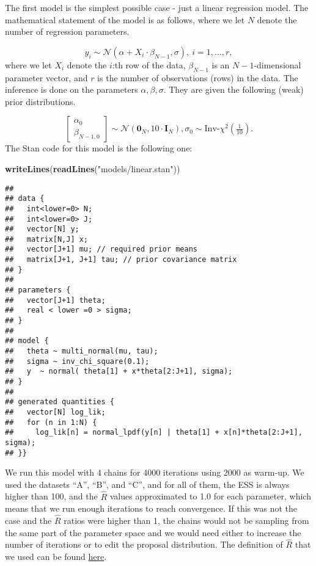 \documentclass[
]{article}
\newenvironment{Shaded}{\begin{snugshade}}{\end{snugshade}}
\newcommand{\KeywordTok}[1]{\textcolor[rgb]{0.13,0.29,0.53}{\textbf{#1}}}
\newcommand{\NormalTok}[1]{#1}
\newcommand{\StringTok}[1]{\textcolor[rgb]{0.31,0.60,0.02}{#1}}
\begin{document}
The first model is the simplest possible case - just a linear regression
model. The mathematical statement of the model is as follows, where we
let \(N\) denote the number of regression parameters.

\[ y_{i} \sim \mathcal{N}(\alpha + X_i \cdot\beta_{N-1}, \sigma), \ i=1,\dots,r, \]
where we let \(X_i\) denote the \(i\):th row of the data,
\(\beta_{N-1}\) is an \(N-1\)-dimensional parameter vector, and \(r\) is
the number of observations (rows) in the data. The inference is done on
the parameters \(\alpha , \beta, \sigma.\) They are given the following
(weak) prior distributions.

\[\begin{bmatrix} \alpha_0 \\ \beta_{N-1,0} \end{bmatrix} \sim \mathcal{N}(\mathbf{0}_N, 10 \cdot \mathbf{I}_N), \sigma_0 \sim \textrm{Inv-}\chi^2(\tfrac{1}{10}) .\]
The Stan code for this model is the following one:

\begin{Shaded}
\begin{Highlighting}[]
\KeywordTok{writeLines}\NormalTok{(}\KeywordTok{readLines}\NormalTok{(}\StringTok{"models/linear.stan"}\NormalTok{))}
\end{Highlighting}
\end{Shaded}

\begin{verbatim}
## 
## data {
##   int<lower=0> N;
##   int<lower=0> J;
##   vector[N] y;
##   matrix[N,J] x;
##   vector[J+1] mu; // required prior means 
##   matrix[J+1, J+1] tau; // prior covariance matrix
## }
## 
## parameters {
##   vector[J+1] theta;
##   real < lower =0 > sigma;
## }
## 
## model {
##   theta ~ multi_normal(mu, tau);
##   sigma ~ inv_chi_square(0.1);
##   y  ~ normal( theta[1] + x*theta[2:J+1], sigma);
## }
## 
## generated quantities {
##   vector[N] log_lik;
##   for (n in 1:N) {
##     log_lik[n] = normal_lpdf(y[n] | theta[1] + x[n]*theta[2:J+1], sigma);
## }}
\end{verbatim}

We run this model with 4 chains for 4000 iterations using 2000 as
warm-up. We used the datasets ``A'', ``B'', and ``C'', and for all of
them, the ESS is always higher than 100, and the \(\hat{R}\) values
approximated to 1.0 for each parameter, which means that we run enough
iterations to reach convergence. If this was not the case and the
\(\hat{R}\) ratios were higher than 1, the chains would not be sampling
from the same part of the parameter space and we would need either to
increase the number of iterations or to edit the proposal distribution.
The definition of \(\hat{R}\) that we used can be found
\href{https://arxiv.org/abs/1903.08008}{here}.
\end{document}
